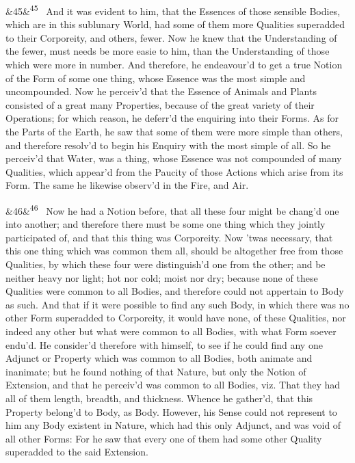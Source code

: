 \documentclass[12pt]{article}
\newcommand{\para}[1][]{\par\noindent\ifx&#1&\else\textsuperscript{\footnotesize #1}~\fi}
\begin{document}
\para[45] And it was evident to him, that the Essences of those sensible Bodies, which are in this sublunary World, had some of them more Qualities superadded to their Corporeity, and others, fewer. Now he knew that the Understanding of the fewer, must needs be more easie to him, than the Understanding of those which were more in number. And therefore, he endeavour'd to get a true Notion of the Form of some one thing, whose Essence was the most simple and uncompounded. Now he perceiv'd that the Essence of Animals and Plants consisted of a great many Properties, because of the great variety of their Operations; for which reason, he deferr'd the enquiring into their Forms. As for the Parts of the Earth, he saw that some of them were more simple than others, and therefore resolv'd to begin his Enquiry with the most simple of all. So he perceiv'd that Water, was a thing, whose Essence was not compounded of many Qualities, which appear'd from the Paucity of those Actions which arise from its Form. The same he likewise observ'd in the Fire, and Air.

\para[46] Now he had a Notion before, that all these four might be chang'd one into another; and therefore there must be some one thing which they jointly participated of, and that this thing was Corporeity. Now 'twas necessary, that this one thing which was common them all, should be altogether free from those Qualities, by which these four were distinguish'd one from the other; and be neither heavy nor light; hot nor cold; moist nor dry; because none of these Qualities were common to all Bodies, and therefore could not appertain to Body as such. And that if it were possible to find any such Body, in which there was no other Form superadded to Corporeity, it would have none, of these Qualities, nor indeed any other but what were common to all Bodies, with what Form soever endu'd. He consider'd therefore with himself, to see if he could find any one Adjunct or Property which was common to all Bodies, both animate and inanimate; but he found nothing of that Nature, but only the Notion of Extension, and that he perceiv'd was common to all Bodies, viz. That they had all of them length, breadth, and thickness. Whence he gather'd, that this Property belong'd to Body, as Body. However, his Sense could not represent to him any Body existent in Nature, which had this only Adjunct, and was void of all other Forms: For he saw that every one of them had some other Quality superadded to the said Extension.
\end{document}
